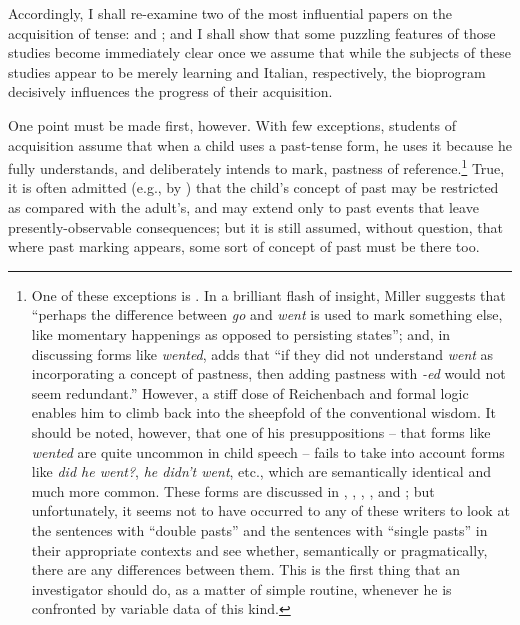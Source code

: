 Accordingly, I shall re-examine two of the most influential papers on the acquisition of tense: \citet{BrockartEtAl1973} and \citet{AntinucciEtAl1976}; and I shall show that some puzzling features of those studies become immediately clear once we assume that while the subjects of these studies appear to be merely learning  and Italian, respectively, the bioprogram decisively influences the progress of their acquisition.

One point must be made first, however. With few exceptions, students of acquisition assume that when a child uses a past-tense form, he uses it because he fully understands, and deliberately intends to mark, pastness of reference.\footnote{One of these exceptions is \citet{Miller1978}. In a brilliant flash of insight, Miller suggests that ``perhaps the difference between \textit{go} and \textit{went} is used to mark something else, like momentary happenings as opposed to persisting states''; and, in discussing forms like \textit{wented}, adds that ``if they did not understand \textit{went} as incorporating a concept of pastness, then adding pastness with \textit{-ed} would not seem redundant.'' However, a stiff dose of Reichenbach and formal logic enables him to climb back into the sheepfold of the conventional wisdom. It should be noted, however, that one of his presuppositions -- that forms like \textit{wented} are quite uncommon in child speech -- fails to take into account forms like \textit{did he went?}, \textit{he didn't went}, etc., which are semantically identical and much more common. These forms are discussed in \citet{Hurford1975}, \citet{Kuczaj1976}, \citet{Fay1978}, \citet{MaratsosEtAl1978}, and \citet{ErreichEtAl1980}; but unfortunately, it seems not to have occurred to any of these writers to look at the sentences with ``double pasts'' and the sentences with ``single pasts'' in their appropriate contexts and see whether, semantically or pragmatically, there are any differences between them. This is the first thing that an investigator should do, as a matter of simple routine, whenever he is confronted by variable data of this kind.\label{Fn5}} True, it is often admitted (e.g., by \citealt{AntinucciEtAl1976}) that the child's concept of past may be restricted as compared with the adult's, and may extend only to past events that leave presently-observable consequences; but it is still assumed, without question, that where past marking appears, some sort of concept of past must be there too.

